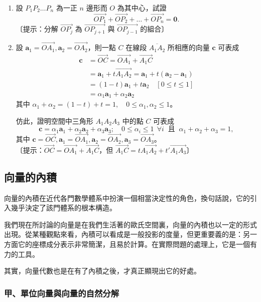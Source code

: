 \begin{enumerate}[label=\arabic*., leftmargin=2em]
  \item 設 $P_1 P_2 \dots P_n$ 為一正 $n$ 邊形而 $O$ 為其中心，試證
  \[ \vec{OP_1} + \vec{OP_2} + \dots + \vec{OP_n} = \mathbf{0}. \]
  〔提示：分解 $\vec{OP_j}$ 為 $\vec{OP_{j+1}}$ 與 $\vec{OP_{j-1}}$ 的組合〕
  \item 設 $\mathbf{a}_1 = \vec{OA_1}, \mathbf{a}_2 = \vec{OA_2}$，則一點 $C$ 在線段 $\overline{A_1 A_2}$ 所相應的向量 $\mathbf{c}$ 可表成
  \begin{align*}
  \mathbf{c} &= \vec{OC} = \vec{OA_1} + \vec{A_1 C} \\
  &= \mathbf{a}_1 + t\vec{A_1 A_2} = \mathbf{a}_1 + t(\mathbf{a}_2 - \mathbf{a}_1) \\
  &= (1 - t)\mathbf{a}_1 + t\mathbf{a}_2 \quad [0 \le t \le 1] \\
  &= \alpha_1\mathbf{a}_1 + \alpha_2\mathbf{a}_2
  \end{align*}
  其中 $\alpha_1 + \alpha_2 = (1 - t) + t = 1, \quad 0 \le \alpha_1, \alpha_2 \le 1$。

  仿此，證明空間中三角形 $A_1 A_2 A_3$ 中的點 $C$ 可表成
  \[ \mathbf{c} = \alpha_1\mathbf{a}_1 + \alpha_2\mathbf{a}_2 + \alpha_3\mathbf{a}_3; \quad 0 \le \alpha_i \le 1 \ \ \forall i \ \text{ 且 } \ \alpha_1 + \alpha_2 + \alpha_3 = 1, \]
  其中 $\mathbf{c} = \vec{OC}, \mathbf{a}_1 = \vec{OA_1}, \mathbf{a}_2 = \vec{OA_2}, \mathbf{a}_3 = \vec{OA_3}$。\\
  〔提示：$\vec{OC} = \vec{OA_1} + \vec{A_1 C}$，但 $\vec{A_1 C} = t\vec{A_1 A_2} + t'\vec{A_1 A_3}$〕
\end{enumerate}

\subsection{向量的內積}
\label{sec:b3s-3-5}

向量的內積在近代各門數學體系中扮演一個相當決定性的角色，換句話說，它的引入幾乎決定了該門體系的根本構造。

我們現在所討論的向量是在我們生活著的歐氏空間裏，向量的內積也以一定的形式出現。從某種觀點來看，內積可以看成是一般投影的度量，但更重要義的是：另一方面它的座標成分表示非常簡潔，且易於計算。在實際問題的處理上，它是一個有力的工具。

其實，向量代數也是在有了內積之後，才真正顯現出它的好處。

\subsubsection*{甲、單位向量與向量的自然分解}


